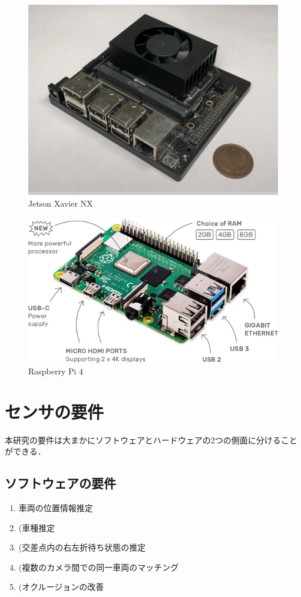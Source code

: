 \begin{figure}[t]
    \includegraphics*[bb=0 0 950 700, width=1\linewidth]{./images/jetsonNX.png}
    \caption{Jetson Xavier NX} 
    \label{tab:jetson}
  \end{figure}

  \begin{figure}[t]
    \includegraphics*[bb=0 0 950 600, width=1\linewidth]{./images/raspi4.png}
    \caption{Raspberry Pi 4} 
    \label{tab:raspi}
  \end{figure}


\section{センサの要件}
本研究の要件は大まかにソフトウェアとハードウェアの2つの側面に分けることができる．
\subsection{ソフトウェアの要件}
\begin{enumerate}
	\item 車両の位置情報推定
	\item (車種推定
	\item (交差点内の右左折待ち状態の推定
	\item (複数のカメラ間での同一車両のマッチング
	\item (オクルージョンの改善
\end{enumerate}

